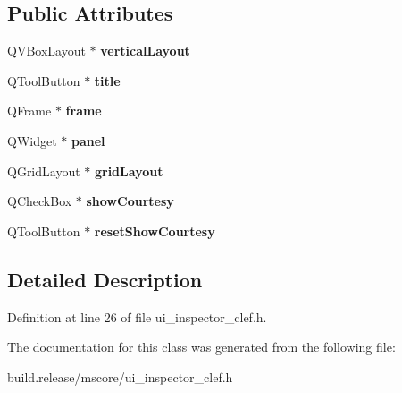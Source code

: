\subsection*{Public Attributes}
\begin{DoxyCompactItemize}
\item 
\mbox{\label{class_ui___inspector_clef_a22e11fad87b22315b8c5fdea91537c82}} 
Q\+V\+Box\+Layout $\ast$ {\bfseries vertical\+Layout}
\item 
\mbox{\label{class_ui___inspector_clef_abbe7f06b3bfb9ea221f01a0d5d3a3344}} 
Q\+Tool\+Button $\ast$ {\bfseries title}
\item 
\mbox{\label{class_ui___inspector_clef_a69fed884f50b4a2104a51245abb0033b}} 
Q\+Frame $\ast$ {\bfseries frame}
\item 
\mbox{\label{class_ui___inspector_clef_a845678999f77dbe0bda78de88ca1269a}} 
Q\+Widget $\ast$ {\bfseries panel}
\item 
\mbox{\label{class_ui___inspector_clef_a34b4b8f4a13b8d6baca0a7bcca1f2a12}} 
Q\+Grid\+Layout $\ast$ {\bfseries grid\+Layout}
\item 
\mbox{\label{class_ui___inspector_clef_ad55c84c4aa27c3f4db6842068a35d86c}} 
Q\+Check\+Box $\ast$ {\bfseries show\+Courtesy}
\item 
\mbox{\label{class_ui___inspector_clef_a826fea1aceaf80f7a819e4ef1d56c17e}} 
Q\+Tool\+Button $\ast$ {\bfseries reset\+Show\+Courtesy}
\end{DoxyCompactItemize}


\subsection{Detailed Description}


Definition at line 26 of file ui\+\_\+inspector\+\_\+clef.\+h.



The documentation for this class was generated from the following file\+:\begin{DoxyCompactItemize}
\item 
build.\+release/mscore/ui\+\_\+inspector\+\_\+clef.\+h\end{DoxyCompactItemize}
